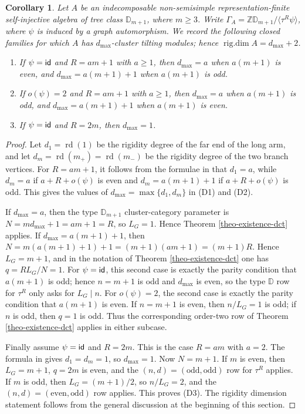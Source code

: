 \documentclass[12pt]{article}
\theoremstyle{plain}
\newtheorem{Coro}[Def]{Corollary}
\theoremstyle{definition}
\DeclareMathOperator{\id}{\sf id}
\DeclareMathOperator{\rigdim}{rig.dim}
\DeclareMathOperator{\rd}{rd}
\renewcommand{\geq}{\geqslant}
\begin{document}
\begin{Coro}
\label{coro-rigdim-type-D-closed-families}
Let \(A\) be an indecomposable non-semisimple representation-finite
self-injective algebra of tree class \(\mathbb D_{m+1}\), where \(m\geq3\).
Write \(\Gamma_A=\mathbb Z\mathbb D_{m+1}/\langle\tau^R\psi\rangle\), where
\(\psi\) is induced by a graph automorphism.  We record the following closed
families for which \(A\) has \(d_{\max}\)-cluster tilting modules; hence
\(\rigdim A=d_{\max}+2\).
\begin{enumerate}[label={\rm(D\arabic*)}]
\item If \(\psi=\id\) and \(R=am+1\) with \(a\geq1\), then
\(d_{\max}=a\) when \(a(m+1)\) is even, and
\(d_{\max}=a(m+1)+1\) when \(a(m+1)\) is odd.
\item If \(o(\psi)=2\) and \(R=am+1\) with \(a\geq1\), then
\(d_{\max}=a\) when \(a(m+1)\) is odd, and
\(d_{\max}=a(m+1)+1\) when \(a(m+1)\) is even.
\item If \(\psi=\id\) and \(R=2m\), then \(d_{\max}=1\).
\end{enumerate}
\end{Coro}

\begin{proof}
Let \(d_1=\rd(1)\) be the
rigidity degree of the far end of the long arm, and let
\(d_m=\rd(m_+)=\rd(m_-)\) be the rigidity degree of the two branch vertices.
For \(R=am+1\), it follows from the formulae in \cite[Theorem 5.1]{HuYinRigidityDegrees} that
\(d_1=a\), while \(d_m=a\) if \(a+R+o(\psi)\) is even and
\(d_m=a(m+1)+1\) if \(a+R+o(\psi)\) is odd.  This gives the values
of \(d_{\max}=\max\{d_1,d_m\}\) in (D1) and (D2).

If \(d_{\max}=a\), then the type \(\mathbb D_{m+1}\) cluster-category
parameter is \(N=md_{\max}+1=am+1=R\), so \(L_G=1\).  Hence Theorem
\ref{theo-existence-dct} applies.  If \(d_{\max}=a(m+1)+1\), then
\(N=m(a(m+1)+1)+1=(m+1)(am+1)=(m+1)R\).  Hence \(L_G=m+1\), and in the
notation of Theorem \ref{theo-existence-dct} one has \(q=RL_G/N=1\).  For
\(\psi=\id\), this second case is exactly the parity condition that
\(a(m+1)\) is odd; hence \(n=m+1\) is odd and \(d_{\max}\) is even, so the
type \(\mathbb D\) row for \(\tau^R\) only asks for \(L_G\mid n\).  For
\(o(\psi)=2\), the second case is exactly the parity condition that
\(a(m+1)\) is even.  If \(n=m+1\) is even, then \(n/L_G=1\) is odd; if \(n\)
is odd, then \(q=1\) is odd.  Thus the corresponding order-two row of Theorem
\ref{theo-existence-dct} applies in either subcase.

Finally assume \(\psi=\id\) and \(R=2m\).  This is the case \(R=am\) with
\(a=2\).  The formula in \cite{HuYinRigidityDegrees} gives \(d_1=d_m=1\), so \(d_{\max}=1\).  Now
\(N=m+1\).  If \(m\) is even, then \(L_G=m+1\), \(q=2m\) is even, and the
\((n,d)=(\text{odd},\text{odd})\) row for \(\tau^R\) applies.  If \(m\) is
odd, then \(L_G=(m+1)/2\), so \(n/L_G=2\), and the
\((n,d)=(\text{even},\text{odd})\) row applies.  This proves (D3).  The
rigidity dimension statement follows from the general discussion at the
beginning of this section.
\end{proof}
\end{document}
